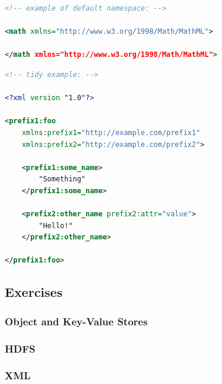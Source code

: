 \begin{lstlisting}[language=XML]
<!-- example of default namespace: -->

<math xmlns="http://www.w3.org/1998/Math/MathML">

</math xmlns="http://www.w3.org/1998/Math/MathML">
\end{lstlisting}

\begin{lstlisting}[language=XML]
<!-- tidy example: -->

<?xml version "1.0"?>

<prefix1:foo
    xmlns:prefix1="http://example.com/prefix1"
    xmlns:prefix2="http://example.com/prefix2">
    
    <prefix1:some_name>
        "Something"
    </prefix1:some_name>
    
    <prefix2:other_name prefix2:attr="value">
        "Hello!"
    </prefix2:other_name>
    
</prefix1:foo>
\end{lstlisting}



























\subsection{Exercises}

\subsubsection{Object and Key-Value Stores}

\subsubsection{HDFS}

\subsubsection{XML}
